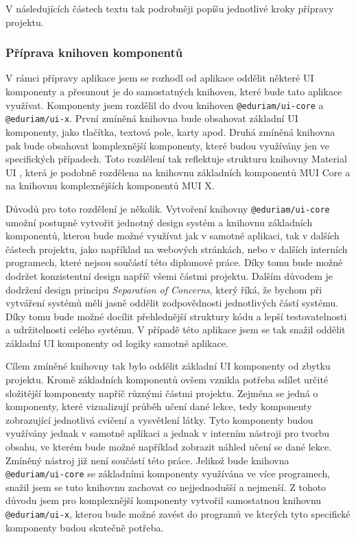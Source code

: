 V následujících částech textu tak podrobněji popíšu jednotlivé kroky přípravy projektu.

\subsubsection{Příprava knihoven komponentů}

V rámci přípravy aplikace jsem se rozhodl od aplikace oddělit některé UI komponenty a přesunout je do samostatných knihoven, které bude tato aplikace využívat. Komponenty jsem rozdělil do dvou knihoven \texttt{@eduriam/ui-core} a \texttt{@eduriam/ui-x}. První zmíněná knihovna bude obsahovat základní UI komponenty, jako tlačítka, textová pole, karty apod. Druhá zmíněná knihovna pak bude obsahovat komplexnější komponenty, které budou využívány jen ve specifických případech. Toto rozdělení tak reflektuje strukturu knihovny Material UI \cite{MaterialUI}, která je podobně rozdělena na knihovnu základních komponentů MUI Core a na knihovnu komplexnějších komponentů MUI X.

Důvodů pro toto rozdělení je několik. Vytvoření knihovny \texttt{@eduriam/ui-core} umožní postupně vytvořit jednotný design systém a knihovnu základních komponentů, kterou bude možné využívat jak v samotné aplikaci, tak v dalších částech projektu, jako například na webových stránkách, nebo v dalších interních programech, které nejsou součástí této diplomové práce. Díky tomu bude možné dodržet konzistentní design napříč všemi částmi projektu. Dalším důvodem je dodržení design principu \textit{Separation of Concerns}, který říká, že bychom při vytváření systémů měli jasně oddělit zodpovědnosti jednotlivých částí systému. Díky tomu bude možné docílit přehlednější struktury kódu a lepší testovatelnosti a udržitelnosti celého systému. V případě této aplikace jsem se tak snažil oddělit základní UI komponenty od logiky samotné aplikace.

Cílem zmíněné knihovny tak bylo oddělit základní UI komponenty od zbytku projektu. Kromě základních komponentů ovšem vznikla potřeba sdílet určité složitější komponenty napříč různými částmi projektu. Zejména se jedná o komponenty, které vizualizují průběh učení dané lekce, tedy komponenty zobrazující jednotlivá cvičení a vysvětlení látky. Tyto komponenty budou využívány jednak v samotné aplikaci a jednak v interním nástroji pro tvorbu obsahu, ve kterém bude možné například zobrazit náhled učení se dané lekce. Zmíněný nástroj již není součástí této práce. Jelikož bude knihovna \texttt{@eduriam/ui-core} se základními komponenty využívána ve více programech, snažil jsem se tuto knihovnu zachovat co nejjednodušší a nejmenší. Z tohoto důvodu jsem pro komplexnější komponenty vytvořil samostatnou knihovnu \texttt{@eduriam/ui-x}, kterou bude možné zavést do programů ve kterých tyto specifické komponenty budou skutečně potřeba.

